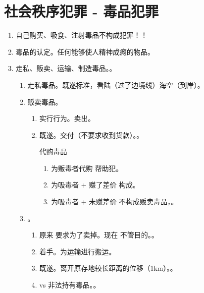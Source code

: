 \section{社会秩序犯罪 - 毒品犯罪}
\begin{enumerate}
  \item 自己购买、吸食、注射毒品不构成犯罪！！
  \item 毒品的认定。任何能够使人精神成瘾的物品。
  \item 走私、贩卖、运输、制造毒品。。
        \begin{enumerate}
          \item 走私毒品。既遂标准，看陆（过了边境线）海空（到岸）。
          \item 贩卖毒品。
                \begin{enumerate}
                  \item 实行行为。卖出。
                  \item 既遂。交付（不要求收到货款）。。
                        \begin{kk}{代购毒品}
                          \begin{enumerate}
                            \item 为贩毒者代购 \yjt 帮助犯。
                            \item 为吸毒者 + 赚了差价 \yjt 构成。
                            \item 为吸毒者 + 未赚差价 \yjt 不构成贩卖毒品，。
                          \end{enumerate}
                        \end{kk}
                \end{enumerate}
          \item {}。
                \begin{enumerate}
                  \item 原来 \yjt 要求为了卖掉。现在 \yjt 不管目的。。
                  \item 着手。为运输进行搬运。
                  \item 既遂。离开原存地较长距离的位移（1km）。。
                  \item vs 非法持有毒品。。
                \end{enumerate}

\end{enumerate}
\end{enumerate}
